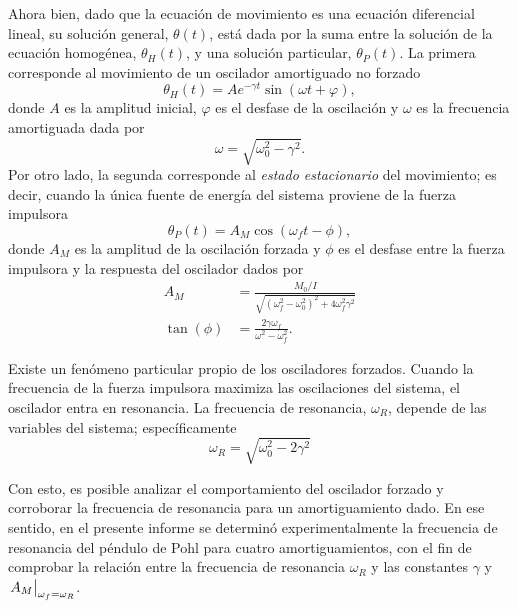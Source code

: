 Ahora bien, dado que la ecuación de movimiento es una ecuación diferencial lineal, su solución
general, $\theta(t)$, está dada por la suma entre la solución de la ecuación homogénea, 
$\theta_H(t)$, y una solución particular, $\theta_P(t)$. La primera corresponde al movimiento
de un oscilador amortiguado no forzado
\begin{equation*}
	\theta_H(t) = Ae^{-\gamma t}\sin(\omega t +\varphi),
\end{equation*}
donde $A$ es la amplitud inicial, $\varphi$ es el desfase de la oscilación y $\omega$ es la
frecuencia amortiguada dada por
\begin{equation}
	\omega=\sqrt{\omega_0^2-\gamma^2}.
\end{equation}
Por otro lado, la segunda corresponde al \textit{estado estacionario} del movimiento; es decir,
cuando la única fuente de energía del sistema proviene de la fuerza impulsora
\begin{equation}\label{eq:solucionparticular}
	\theta_P(t) = A_M\cos(\omega_f t - \phi),
\end{equation}
donde $A_M$ es la amplitud de la oscilación forzada y $\phi$ es el desfase entre la fuerza
impulsora y la respuesta del oscilador dados por
\begin{align}
	A_M &= \frac{M_0/I}{\sqrt{\left(\omega_f^2 - \omega_0^2\right)^2 + 4\omega_f^2 \gamma^2}} \label{eq:amplitudforzada} \\
	\tan(\phi) &= \frac{2\gamma\omega_f}{\omega^2 - \omega_f^2}. \label{eq:desfaseforzado}
\end{align}

Existe un fenómeno particular propio de los osciladores forzados. Cuando la frecuencia de la
fuerza impulsora maximiza las oscilaciones del sistema, el oscilador entra en resonancia.
La frecuencia de resonancia, $\omega_R$, depende de las variables del sistema; específicamente
\begin{equation}\label{eq:frecuenciaresonancia}
	\omega_R = \sqrt{\omega_0^2 - 2\gamma^2}
\end{equation}

Con esto, es posible analizar el comportamiento del oscilador forzado y corroborar la
frecuencia de resonancia para un amortiguamiento dado. En ese sentido, en el presente informe
se determinó experimentalmente la frecuencia de resonancia del péndulo de Pohl para cuatro
amortiguamientos, con el fin de comprobar la relación entre la frecuencia de resonancia
$\omega_R$ y las constantes $\gamma$ y $\eval{A_M}_{\omega_f=\omega_R}$.

